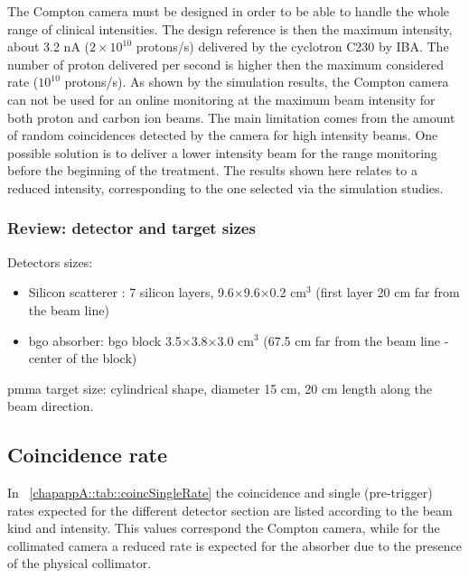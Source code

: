 The Compton camera must be designed in order to be able to handle the whole range of clinical intensities. The design reference is then the maximum intensity, about 3.2 nA ($2\times10^{10}$ protons/s) delivered by the cyclotron C230 by IBA. The number of proton delivered per second is higher then the maximum considered rate ($10^{10}$ protons/s).\newline
As shown by the simulation results, the Compton camera can not be used for an online monitoring at the maximum beam intensity for both proton and carbon ion beams. The main limitation comes from the amount of random coincidences detected by the camera for high intensity beams. One possible solution is to deliver a lower intensity beam for the range monitoring before the beginning of the treatment. The results shown here relates to a reduced intensity, corresponding to the one selected via the simulation studies.

\subsubsection{Review: detector and target sizes}\label{chapappA::subsubsec::revDetTargetSize}
Detectors sizes:
\begin{itemize}
	\item Silicon scatterer : 7 silicon layers, 9.6$\times$9.6$\times$0.2 cm$\mathrm{^{3}}$ (first layer 20 cm far from the beam line)
	\item \gls{bgo} absorber: \gls{bgo} block 3.5$\times$3.8$\times$3.0 cm$\mathrm{^{3}}$ (67.5 cm far from the beam line - center of the block)\newline
\end{itemize}
\gls{pmma} target size: cylindrical shape, diameter 15 cm,  20 cm length along the beam direction.


\subsection{Coincidence rate}\label{chapappA::subsec::coincRate}
In \tablename~\ref{chapappA::tab::coincSingleRate} the coincidence and single (pre-trigger) rates expected for the different detector section are listed according to the beam kind and intensity. This values correspond the Compton camera, while for the collimated camera a reduced rate is expected for the absorber due to the presence of the physical collimator.

